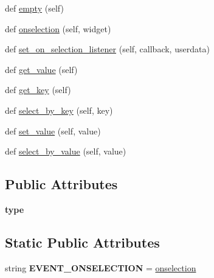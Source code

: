 \begin{DoxyCompactItemize}
\item 
def \hyperlink{classremi_1_1gui_1_1ListView_a8142a456f56465229168e7910b2a5406}{empty} (self)
\item 
def \hyperlink{classremi_1_1gui_1_1ListView_adcdc5be097dc81ce9e96b36adeb63d1c}{onselection} (self, widget)
\item 
def \hyperlink{classremi_1_1gui_1_1ListView_aae509720cebc82534989b955bcbc82c8}{set\+\_\+on\+\_\+selection\+\_\+listener} (self, callback, userdata)
\item 
def \hyperlink{classremi_1_1gui_1_1ListView_ad729d9dc0f1e6fd8c42e3f0205c0efc7}{get\+\_\+value} (self)
\item 
def \hyperlink{classremi_1_1gui_1_1ListView_ae916dd25166229d79ed619bf51bfad10}{get\+\_\+key} (self)
\item 
def \hyperlink{classremi_1_1gui_1_1ListView_aedfdc65ab96226786f68bbab0d1c1eec}{select\+\_\+by\+\_\+key} (self, key)
\item 
def \hyperlink{classremi_1_1gui_1_1ListView_a2691e177503dde04d12b1312b597a9ec}{set\+\_\+value} (self, value)
\item 
def \hyperlink{classremi_1_1gui_1_1ListView_a9be5a47ec5d98915429a3486b8611f1f}{select\+\_\+by\+\_\+value} (self, value)
\end{DoxyCompactItemize}
\subsection*{Public Attributes}
\begin{DoxyCompactItemize}
\item 
{\bfseries type}\hypertarget{classremi_1_1gui_1_1ListView_a8a6331d3580fdb495af3f808aa92cdab}{}\label{classremi_1_1gui_1_1ListView_a8a6331d3580fdb495af3f808aa92cdab}

\end{DoxyCompactItemize}
\subsection*{Static Public Attributes}
\begin{DoxyCompactItemize}
\item 
string {\bfseries E\+V\+E\+N\+T\+\_\+\+O\+N\+S\+E\+L\+E\+C\+T\+I\+ON} = \textquotesingle{}\hyperlink{classremi_1_1gui_1_1ListView_adcdc5be097dc81ce9e96b36adeb63d1c}{onselection}\textquotesingle{}\hypertarget{classremi_1_1gui_1_1ListView_a88da212b5bf6284eef0cf0887e8dc9a8}{}\label{classremi_1_1gui_1_1ListView_a88da212b5bf6284eef0cf0887e8dc9a8}

\end{DoxyCompactItemize}


